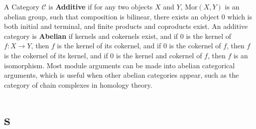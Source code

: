 A Category $\mathcal{C}$ is {\bf Additive} if for any two objects $X$ and $Y$, $\text{Mor}(X,Y)$ is an abelian group, such that composition is bilinear, there exists an object $0$ which is both initial and terminal, and finite products and coproducts exist. An additive category is {\bf Abelian} if kernels and cokernels exist, and if $0$ is the kernel of $f: X \to Y$, then $f$ is the kernel of its cokernel, and if $0$ is the cokernel of $f$, then $f$ is the cokernel of its kernel, and if $0$ is the kernel and cokernel of $f$, then $f$ is an isomorphism. Most module arguments can be made into abelian categorical arguments, which is useful when other abelian categories appear, such as the category of chain complexes in homology theory.



\section{s}

